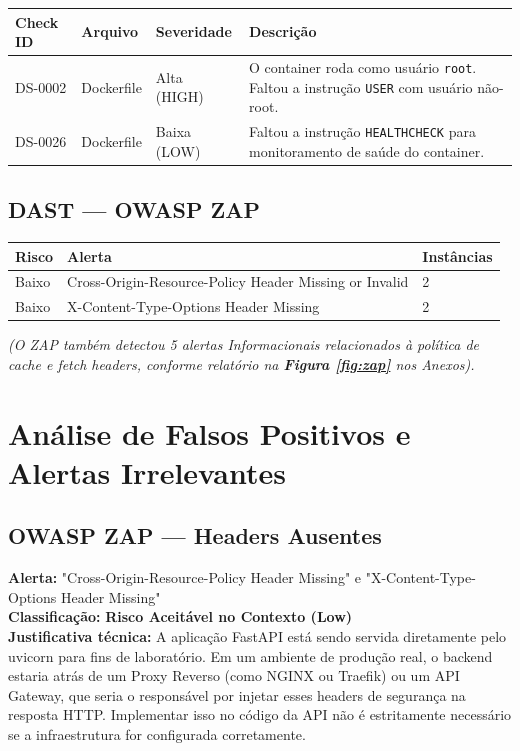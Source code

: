 \documentclass[12pt,a4paper]{article}
\begin{document}
\begin{table}[h]
\centering
\begin{tabularx}{\textwidth}{|l|l|l|X|}
\hline
\textbf{Check ID} & \textbf{Arquivo} & \textbf{Severidade} & \textbf{Descrição} \\ \hline
DS-0002 & Dockerfile & Alta (HIGH) & O container roda como usuário \texttt{root}. Faltou a instrução \texttt{USER} com usuário não-root. \\ \hline
DS-0026 & Dockerfile & Baixa (LOW) & Faltou a instrução \texttt{HEALTHCHECK} para monitoramento de saúde do container. \\ \hline
\end{tabularx}
\end{table}



\subsection{DAST — OWASP ZAP}

\begin{table}[h]
\centering
\begin{tabularx}{\textwidth}{|l|X|l|}
\hline
\textbf{Risco} & \textbf{Alerta} & \textbf{Instâncias} \\ \hline
Baixo & Cross-Origin-Resource-Policy Header Missing or Invalid & 2 \\ \hline
Baixo & X-Content-Type-Options Header Missing & 2 \\ \hline
\end{tabularx}
\end{table}

\textit{(O ZAP também detectou 5 alertas Informacionais relacionados à política de cache e fetch headers, conforme relatório na \textbf{Figura \ref{fig:zap}} nos Anexos).}



\section{Análise de Falsos Positivos e Alertas Irrelevantes}

\subsection{OWASP ZAP — Headers Ausentes}
\textbf{Alerta:} "Cross-Origin-Resource-Policy Header Missing" e "X-Content-Type-Options Header Missing" \\
\textbf{Classificação:} \textbf{Risco Aceitável no Contexto (Low)} \\
\textbf{Justificativa técnica:} A aplicação FastAPI está sendo servida diretamente pelo uvicorn para fins de laboratório. Em um ambiente de produção real, o backend estaria atrás de um Proxy Reverso (como NGINX ou Traefik) ou um API Gateway, que seria o responsável por injetar esses headers de segurança na resposta HTTP. Implementar isso no código da API não é estritamente necessário se a infraestrutura for configurada corretamente.
\end{document}
